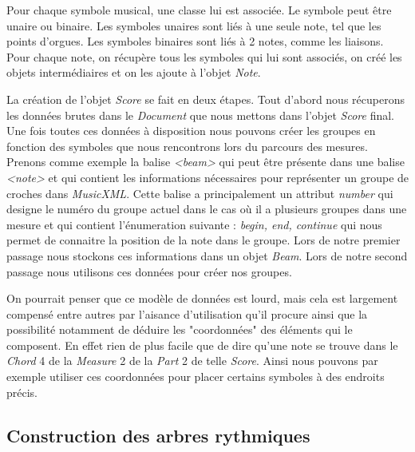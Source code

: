\par
Pour chaque symbole musical, une classe lui est associée. Le symbole peut être unaire ou binaire. Les symboles unaires sont liés à une seule note, tel que les points d'orgues. Les symboles binaires sont liés à 2 notes, comme les liaisons. Pour chaque note, on récupère tous les symboles qui lui sont associés, on créé les objets intermédiaires et on les ajoute à l'objet \emph{Note}.

\par
La création de l'objet \emph{Score} se fait en deux étapes. Tout d'abord nous récuperons les données brutes dans le \emph{Document} que nous mettons dans l'objet \emph{Score} final. Une fois toutes ces données à disposition nous pouvons créer les groupes en fonction des symboles que nous rencontrons lors du parcours des mesures. Prenons comme exemple la balise \emph{<beam>} qui peut être présente dans une balise \emph{<note>} et qui contient les informations nécessaires pour représenter un groupe de croches dans \emph{MusicXML}. Cette balise a principalement un attribut \emph{number} qui designe le numéro du groupe actuel dans le cas où il a plusieurs groupes dans une mesure et qui contient l'énumeration suivante : \emph{begin, end, continue} qui nous permet de connaitre la position de la note dans le groupe. Lors de notre premier passage nous stockons ces informations dans un objet \emph{Beam}. Lors de notre second passage nous utilisons ces données pour créer nos groupes.

\par
On pourrait penser que ce modèle de données est lourd, mais cela est largement compensé entre autres par l'aisance d'utilisation qu'il procure ainsi que la possibilité notamment de déduire les "coordonnées" des éléments qui le composent. En effet rien de plus facile que de dire qu'une note se trouve dans le \emph{Chord} 4 de la \emph{Measure} 2 de la \emph{Part} 2 de telle \emph{Score}. Ainsi nous pouvons par exemple utiliser ces coordonnées pour placer certains symboles à des endroits précis.


\subsection{Construction des arbres rythmiques}

